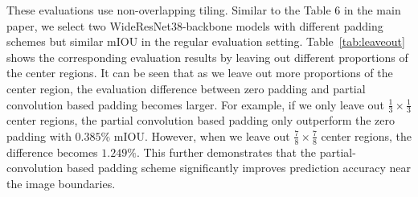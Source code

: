 \documentclass[10pt,twocolumn,letterpaper]{article}
\begin{document}
These evaluations use non-overlapping tiling. Similar to the Table 6 in the main paper, we select two WideResNet38-backbone models with different padding schemes but similar mIOU in the regular evaluation setting. Table~\ref{tab:leaveout} shows the corresponding evaluation results by leaving out different proportions of the center regions. It can be seen that as we leave out more proportions of the center region, the evaluation difference between zero padding and partial convolution based padding becomes larger. For example, if we only leave out $\frac{1}{3}\times\frac{1}{3}$ center regions, the partial convolution based padding only outperform the zero padding with $0.385\%$ mIOU. However, when we leave out $\frac{7}{8}\times\frac{7}{8}$ center regions, the difference becomes $1.249\%$. This further demonstrates that the partial-convolution based padding scheme significantly improves prediction accuracy near the image boundaries.
\end{document}
